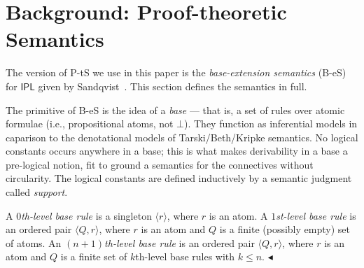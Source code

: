 \documentclass{lipics-v2021}
\newcommand{\fillBox}{\hfill$\blacktriangleleft$}
\newcommand{\supp}[1]{\Vdash_{#1}}
\newcommand{\base}[1]{\mathcal{#1}}                    %
\newcommand{\At}{\mathit{At}}                           %
\newcommand{\IPL}{\textsf{IPL}}
\begin{document}
\section{Background: Proof-theoretic Semantics}
\label{sec:bes}

The version of P-tS we use in this paper is the \emph{base-extension semantics} (B-eS) for $\IPL$ given by Sandqvist~\cite{Sandqvist_Tor}.
 This section defines the semantics in full.

The primitive of  B-eS is the idea of a \emph{base} --- that is, a set of rules over atomic formulae (i.e., propositional atoms, not $\bot$). They function as inferential models in caparison to the denotational models of Tarski/Beth/Kripke semantics. No logical constants occurs anywhere in a base; this is what makes derivability in a base a pre-logical notion, fit to ground a semantics for the connectives without circularity. The logical constants are defined inductively by a semantic judgment called \emph{support}.


 
\begin{definition}
\label{def:base-rule}
A \emph{$0$th-level base rule} is a singleton $\langle r \rangle$, where $r$ is an
atom. A \emph{$1$st-level base rule} is an ordered pair $\langle Q, r \rangle$,
where $r$ is an atom and $Q$ is a finite (possibly empty) set of atoms. An
\emph{$(n+1)$th-level base rule} is an ordered pair $\langle Q, r \rangle$, where
$r$ is an atom and $Q$ is a finite set of $k$th-level base rules with $k \leq n$. \fillBox
\end{definition}
 
\end{document}
